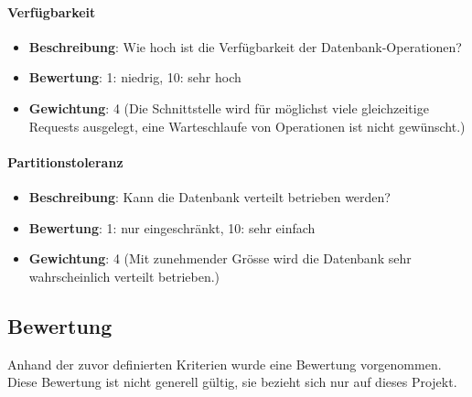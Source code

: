 \paragraph{Verfügbarkeit}
\begin{itemize}
	\item \textbf{Beschreibung}: Wie hoch ist die Verfügbarkeit der Datenbank-Operationen?
	\item \textbf{Bewertung}: 1: niedrig, 10: sehr hoch
	\item \textbf{Gewichtung}: 4 (Die Schnittstelle wird für möglichst viele gleichzeitige Requests ausgelegt, eine Warteschlaufe von Operationen ist nicht gewünscht.)
\end{itemize}

\paragraph{Partitionstoleranz}
\begin{itemize}
	\item \textbf{Beschreibung}: Kann die Datenbank verteilt betrieben werden?
	\item \textbf{Bewertung}: 1: nur eingeschränkt, 10: sehr einfach
	\item \textbf{Gewichtung}: 4 (Mit zunehmender Grösse wird die Datenbank sehr wahrscheinlich verteilt betrieben.)
\end{itemize}

\newpage
\subsection{Bewertung}\label{architektur_bewertung}
Anhand der zuvor definierten Kriterien wurde eine Bewertung vorgenommen. Diese Bewertung ist nicht generell gültig, sie bezieht sich nur auf dieses Projekt.


